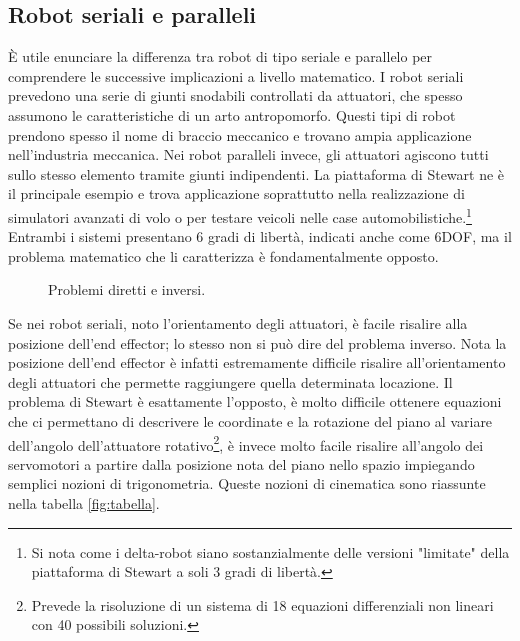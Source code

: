 \documentclass[11pt]{article}
\begin{document}
\subsection{Robot seriali e paralleli}\label{robotserialiparalleli}
È utile enunciare la differenza tra robot di tipo seriale e parallelo per comprendere le successive implicazioni a livello matematico.
I robot seriali prevedono una serie di giunti snodabili controllati da attuatori, che spesso assumono le caratteristiche di un arto antropomorfo. 
Questi tipi di robot prendono spesso il nome di braccio meccanico e trovano ampia applicazione nell'industria meccanica.
Nei robot paralleli invece, gli attuatori agiscono tutti sullo stesso elemento tramite giunti indipendenti. 
La piattaforma di Stewart ne è il principale esempio e trova applicazione soprattutto nella realizzazione di simulatori avanzati di volo o per testare veicoli nelle case automobilistiche.\footnote{Si nota come i delta-robot siano sostanzialmente delle versioni "limitate" della piattaforma di Stewart a soli 3 gradi di libertà.}
Entrambi i sistemi presentano 6 gradi di libertà, indicati anche come 6DOF, ma il problema matematico che li caratterizza è fondamentalmente opposto.


\begin{figure}[h!]
\centering
{}
\caption{Problemi diretti e inversi.} \label{fig:direttoinverso}
\end{figure}

Se nei robot seriali, noto l'orientamento degli attuatori, è facile risalire alla posizione dell'end effector; lo stesso non si può dire del problema inverso. Nota la posizione dell'end effector è infatti estremamente difficile risalire all'orientamento degli attuatori che permette raggiungere quella determinata locazione. Il problema di Stewart è esattamente l'opposto, è molto difficile ottenere equazioni che ci permettano di descrivere le coordinate e la rotazione del piano al variare dell'angolo dell'attuatore rotativo\footnote{Prevede la risoluzione di un sistema di 18 equazioni differenziali non lineari con 40 possibili soluzioni.}, è invece molto facile risalire all'angolo dei servomotori a partire dalla posizione nota del piano nello spazio impiegando semplici nozioni di trigonometria. Queste nozioni di cinematica sono riassunte nella tabella \ref{fig:tabella}.
\end{document}
